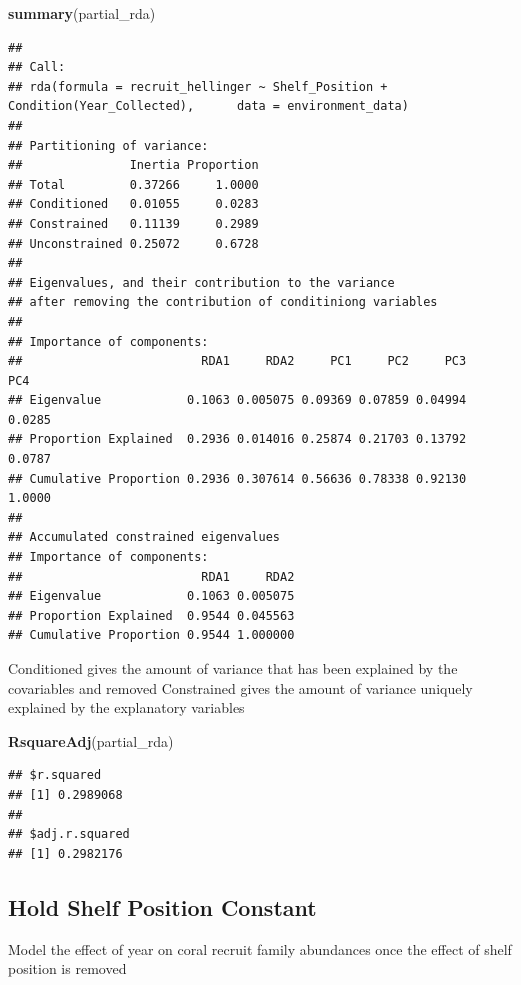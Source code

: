 \documentclass[
]{article}
\newenvironment{Shaded}{\begin{snugshade}}{\end{snugshade}}
\newcommand{\FunctionTok}[1]{\textcolor[rgb]{0.13,0.29,0.53}{\textbf{#1}}}
\newcommand{\NormalTok}[1]{#1}
\begin{document}
\begin{Shaded}
\begin{Highlighting}[]
\FunctionTok{summary}\NormalTok{(partial\_rda)}
\end{Highlighting}
\end{Shaded}

\begin{verbatim}
## 
## Call:
## rda(formula = recruit_hellinger ~ Shelf_Position + Condition(Year_Collected),      data = environment_data) 
## 
## Partitioning of variance:
##               Inertia Proportion
## Total         0.37266     1.0000
## Conditioned   0.01055     0.0283
## Constrained   0.11139     0.2989
## Unconstrained 0.25072     0.6728
## 
## Eigenvalues, and their contribution to the variance 
## after removing the contribution of conditiniong variables
## 
## Importance of components:
##                         RDA1     RDA2     PC1     PC2     PC3    PC4
## Eigenvalue            0.1063 0.005075 0.09369 0.07859 0.04994 0.0285
## Proportion Explained  0.2936 0.014016 0.25874 0.21703 0.13792 0.0787
## Cumulative Proportion 0.2936 0.307614 0.56636 0.78338 0.92130 1.0000
## 
## Accumulated constrained eigenvalues
## Importance of components:
##                         RDA1     RDA2
## Eigenvalue            0.1063 0.005075
## Proportion Explained  0.9544 0.045563
## Cumulative Proportion 0.9544 1.000000
\end{verbatim}

Conditioned gives the amount of variance that has been explained by the
covariables and removed Constrained gives the amount of variance
uniquely explained by the explanatory variables

\begin{Shaded}
\begin{Highlighting}[]
\FunctionTok{RsquareAdj}\NormalTok{(partial\_rda)}
\end{Highlighting}
\end{Shaded}

\begin{verbatim}
## $r.squared
## [1] 0.2989068
## 
## $adj.r.squared
## [1] 0.2982176
\end{verbatim}

\subsection{Hold Shelf Position
Constant}\label{hold-shelf-position-constant}

Model the effect of year on coral recruit family abundances once the
effect of shelf position is removed
\end{document}
